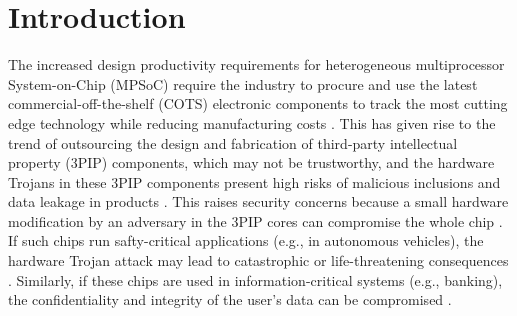\documentclass[10pt,journal, compsoc]{IEEEtran}
\begin{document}
\IEEEdisplaynontitleabstractindextext



%
\IEEEpeerreviewmaketitle



\section{Introduction}

The increased design productivity requirements for heterogeneous multiprocessor System-on-Chip (MPSoC) require the industry to procure and use the latest commercial-off-the-shelf (COTS) electronic components to track the most cutting edge technology while reducing manufacturing costs \cite{article:KX}. This has given rise to the trend of outsourcing the design and fabrication of third-party intellectual property (3PIP) components, which may not be trustworthy, and the hardware Trojans in these 3PIP components present high risks of malicious inclusions and data leakage in products \cite{conference:XW}. This raises security concerns \cite{article:SB} because a small hardware modification by an adversary in the 3PIP cores can compromise the whole chip \cite{conference:MH}. If such chips run safty-critical applications (e.g., in autonomous vehicles), the hardware Trojan attack may lead to catastrophic or life-threatening consequences \cite{conference:AM1}. Similarly, if these chips are used in information-critical systems (e.g., banking), the confidentiality and integrity of the user's data can be compromised \cite{conference:FK}.

\end{document}
